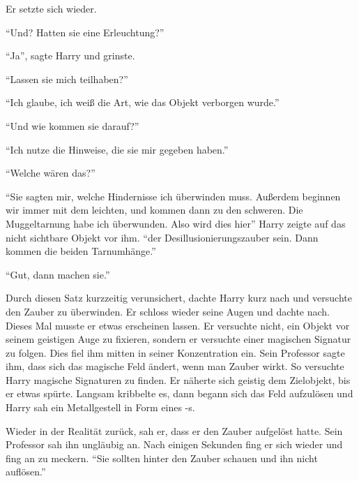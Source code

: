 
Er setzte sich wieder.

\enquote{Und? Hatten sie eine Erleuchtung?}

\enquote{Ja}, sagte Harry und grinste.

\enquote{Lassen sie mich teilhaben?}

\enquote{Ich glaube, ich weiß die Art, wie das Objekt verborgen wurde.}

\enquote{Und wie kommen sie darauf?}

\enquote{Ich nutze die Hinweise, die sie mir gegeben haben.}

\enquote{Welche wären das?}

\enquote{Sie sagten mir, welche Hindernisse ich überwinden muss. Außerdem beginnen wir immer mit dem leichten, und kommen dann zu den schweren. Die Muggeltarnung habe ich überwunden. Also wird dies hier\abs} Harry zeigte auf das nicht sichtbare Objekt vor ihm. \enquote{\aabs der Desillusionierungszauber sein. Dann kommen die beiden Tarnumhänge.}

\enquote{Gut, dann machen sie.}

Durch diesen Satz kurzzeitig verunsichert, dachte Harry kurz nach und versuchte den Zauber zu überwinden. Er schloss wieder seine Augen und dachte nach. Dieses Mal musste er etwas erscheinen lassen. Er versuchte nicht, ein Objekt vor seinem geistigen Auge zu fixieren, sondern er versuchte einer magischen Signatur zu folgen. Dies fiel ihm mitten in seiner Konzentration ein. Sein Professor sagte ihm, dass sich das magische Feld ändert, wenn man Zauber wirkt. So versuchte Harry magische Signaturen zu finden. Er näherte sich geistig dem Zielobjekt, bis er etwas spürte. Langsam kribbelte es, dann begann sich das Feld aufzulösen und Harry sah ein Metallgestell in Form eines -s.

Wieder in der Realität zurück, sah er, dass er den Zauber aufgelöst hatte. Sein Professor sah ihn ungläubig an. Nach einigen Sekunden fing er sich wieder und fing an zu meckern. \enquote{Sie sollten hinter den Zauber schauen und ihn nicht auflösen.}

